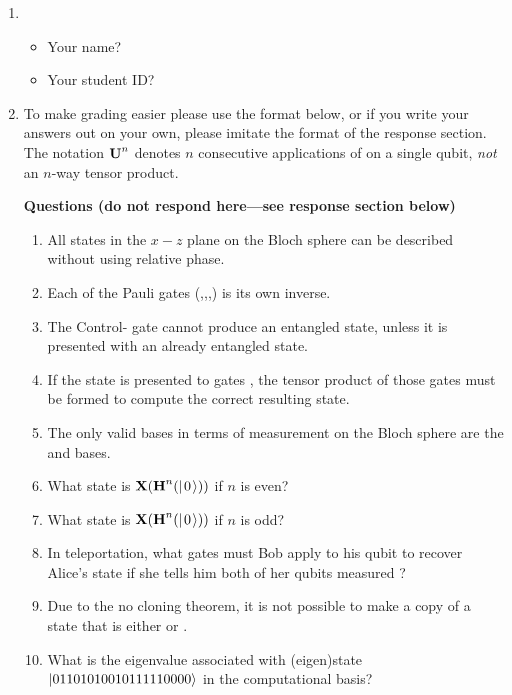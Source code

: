 \documentclass[12pt]{article}
\begin{document}
\begin{enumerate}
    \item{} \begin{itemize}
    \item Your name? \Blank[3in]{}
    \item Your student ID? \Blank[3in]{}
\end{itemize}

\item {} To make grading easier please use the format below, or if you write your answers out on your own, please imitate the format of the response section.  The notation $\mbox{\bfseries{\textrm{U}}}^{n}$ denotes $n$ consecutive applications of  on a single qubit, \emph{not} an $n$-way tensor product.

\textbf{Questions (do not respond here---see response section below)}
\begin{enumerate}[label=\theenumi.\arabic*]
   \item\label{tf:a} All states in the $x-z$ plane on the Bloch sphere can be described without using relative phase.
   \item\label{tf:b} Each of the Pauli gates (\PauliX,\PauliY,\PauliZ,\Hadamard) is its own inverse.
   \item\label{tf:c} The Control-\PauliZ{} gate cannot produce an entangled state, unless it is presented with an already entangled state.
   \item\label{tf:d} If the state  is presented to gates \TensProd{\Hadamard}{\PauliX}, the tensor product of those gates must be formed to compute the correct resulting state.
   \item\label{tf:e} The only valid bases in terms of measurement on the Bloch sphere are the \PauliZ{} and \PauliX{} bases.
   \item\label{tf:f} What state is $\PauliX(\Hadamard^{n}(\QZero))$ if $n$ is even?
      \item\label{tf:g} What state is $\PauliX(\Hadamard^{n}(\QZero))$ if $n$ is odd?
    \item\label{tf:h} In teleportation, what gates must Bob apply to his qubit to recover Alice's state if she tells him both of her qubits measured \QOne{}?
    \item\label{tf:i} Due to the no cloning theorem, it is not possible to make a copy of a state that is either \QZero{} or \QOne{}.
    \item\label{tf:j} What is the eigenvalue associated with (eigen)state $\ket{01101010010111110000}$ in the computational basis?
\end{enumerate}


\end{enumerate}
\end{document}
